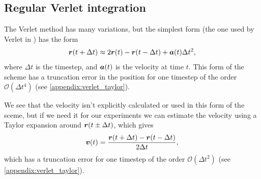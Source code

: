 
%

\subsection{Regular Verlet integration}
The Verlet method has many variations, but the simplest form (the one used by Verlet in \cite{verlet1967computer}) has the form
\begin{align}
    \boldsymbol{r}(t + \Delta t) \approx 2\boldsymbol{r}(t) - \boldsymbol{r}(t - \Delta t) + \boldsymbol{a}(t)\Delta t^2,
    \label{eq:regular_verlet}
\end{align}
where $\Delta t$ is the timestep, and $\boldsymbol{a}(t)$ is the velocity at time $t$. This form of the scheme has a truncation error in the position for one timestep of the order $\mathcal{O}(\Delta t^4)$ (see \cref{appendix:verlet_taylor}).


We see that the velocity isn't explicitly calculated or used in this form of the sceme, but if we need it for our experiments we can estimate the velocity using a Taylor expansion around $\boldsymbol{r}(t\pm\Delta t)$, which gives
\begin{align*}
    \boldsymbol{v}(t) = \frac{\boldsymbol{r}(t + \Delta t) - \boldsymbol{r}(t - \Delta t)}{2\Delta t},
\end{align*}
which has a truncation error for one timestep of the order $\mathcal{O}(\Delta t^2)$ (see \cref{appendix:verlet_taylor}). 

